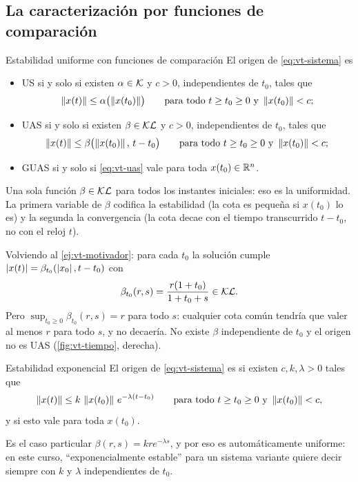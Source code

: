 \subsection{La caracterización por funciones de comparación}

\begin{lema}[label=lem:vt-kl]{Estabilidad uniforme con funciones de comparación \citep[Lema~4.5]{Kha02}}
El origen de \eqref{eq:vt-sistema} es
\begin{itemize}
  \item US si y solo si existen $\alpha\in\mathcal{K}$ y $c>0$, independientes de $t_0$, tales que
  \begin{equation}
    \left\lVert x(t)\right\rVert\le\alpha\bigl(\left\lVert x(t_0)\right\rVert\bigr)\qquad\text{para todo }t\ge t_0\ge0\text{ y }\left\lVert x(t_0)\right\rVert<c ;
    \label{eq:vt-us}
  \end{equation}
  \item UAS si y solo si existen $\beta\in\mathcal{KL}$ y $c>0$, independientes de $t_0$, tales que
  \begin{equation}
    \left\lVert x(t)\right\rVert\le\beta\bigl(\left\lVert x(t_0)\right\rVert,\,t-t_0\bigr)\qquad\text{para todo }t\ge t_0\ge0\text{ y }\left\lVert x(t_0)\right\rVert<c ;
    \label{eq:vt-uas}
  \end{equation}
  \item GUAS si y solo si \eqref{eq:vt-uas} vale para toda $x(t_0)\in\mathbb{R}^n$.
\end{itemize}
\end{lema}

\begin{ideaclave}
Una sola función $\beta\in\mathcal{KL}$ para todos los instantes iniciales: eso es la uniformidad. La primera variable de $\beta$ codifica la estabilidad (la cota es pequeña si $x(t_0)$ lo es) y la segunda la convergencia (la cota decae con el tiempo transcurrido $t-t_0$, no con el reloj $t$).
\end{ideaclave}

Volviendo al \cref{ej:vt-motivador}: para cada $t_0$ la solución cumple $\left\lvert x(t)\right\rvert=\beta_{t_0}(\left\lvert x_0\right\rvert,t-t_0)$ con
\[
  \beta_{t_0}(r,s)=\frac{r(1+t_0)}{1+t_0+s}\in\mathcal{KL} .
\]
Pero $\sup_{t_0\ge0}\beta_{t_0}(r,s)=r$ para todo $s$: cualquier cota común tendría que valer al menos $r$ para todo $s$, y no decaería. No existe $\beta$ independiente de $t_0$ y el origen no es UAS (\cref{fig:vt-tiempo}, derecha).

\begin{definicion}[label=def:vt-exponencial]{Estabilidad exponencial}
El origen de \eqref{eq:vt-sistema} es  si existen $c,k,\lambda>0$ tales que
\[
  \left\lVert x(t)\right\rVert\le k\,\left\lVert x(t_0)\right\rVert\,e^{-\lambda(t-t_0)}\qquad\text{para todo }t\ge t_0\ge0\text{ y }\left\lVert x(t_0)\right\rVert<c ,
\]
y  si esto vale para toda $x(t_0)$.
\end{definicion}

Es el caso particular $\beta(r,s)=kre^{-\lambda s}$, y por eso es automáticamente uniforme: en este curso, ``exponencialmente estable'' para un sistema variante quiere decir siempre con $k$ y $\lambda$ independientes de $t_0$.
